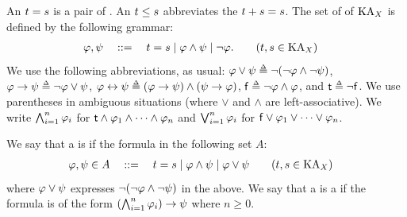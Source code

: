 An \intro*{} $\term[1] = \term[2]$ is a pair of .
An \intro*{} $\term[1] \le \term[2]$ abbreviates the  $\term[1] \union \term[2] = \term[2]$.
The set of \intro*{} of $\mathrm{KA}_{X}$ is defined by the following grammar:
\begin{align*}
    \fml[1], \fml[2] &\quad::=\quad \term[1] = \term[2] \mid \fml[1] \land \fml[2] \mid \lnot \fml[1]. \tag{$\term[1], \term[2] \in \KAtermclass_{X}$}
\end{align*}
We use the following abbreviations, as usual: $\fml[1] \lor \fml[2] \defeq \lnot (\lnot \fml[1] \land \lnot \fml[2])$,
$\fml[1] \to \fml[2] \defeq \lnot \fml[1] \lor \fml[2]$, $\fml[1] \leftrightarrow \fml[2] \defeq (\fml[1] \to \fml[2]) \land (\fml[2] \to \fml[1])$,
$\mathsf{f} \defeq \lnot \fml[1] \land \fml[1]$, and $\mathsf{t} \defeq \lnot \mathsf{f}$.
We use parentheses in ambiguous situations (where $\lor$ and $\land$ are left-associative).
We write $\bigwedge_{i = 1}^{n} \fml_i$ for $\mathsf{t} \land \fml_1 \land \dots \land \fml_n$ and $\bigvee_{i = 1}^{n} \fml_i$ for $\mathsf{f} \lor \fml_1 \lor \dots \lor \fml_n$.

We say that a  is \intro*{} if the formula in the following set $A$:
\begin{align*}
    \fml[1], \fml[2] \in A &\quad::=\quad \term[1] = \term[2] \mid \fml[1] \land \fml[2] \mid \fml[1] \lor \fml[2] \tag{$\term[1], \term[2] \in \KAtermclass_{X}$}
\end{align*}
where $\fml[1] \lor \fml[2]$ expresses $\lnot (\lnot \fml[1] \land \lnot \fml[2])$ in the above.
We say that a  is a \intro*{} if the formula is of the form $(\bigwedge_{i = 1}^{n} \fml[1]_i) \to \fml[2]$ where $n \ge 0$.

